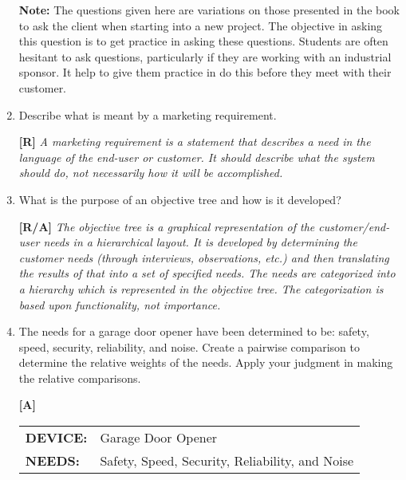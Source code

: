 \begin{enumerate}
\begin{onlysolution}
     \hspace*{1cm}
  \begin{minipage}{.8\textwidth}
  \textbf{Note:} The questions given here are variations on those presented in 
  the book to ask the client when starting into a new project. The objective 
  in asking this question is to get practice in asking these questions. Students 
  are often hesitant to ask questions, particularly if they are working with an 
  industrial sponsor. It help to give them practice in do this before they meet 
  with their customer.
  \end{minipage}
  \end{onlysolution}

\item
  Describe what is meant by a marketing requirement.

  \begin{onlysolution}
  \textbf{[R]}
  \itshape
  A marketing requirement is a statement that describes a need in the language 
  of the end-user or customer. It should describe what the system should do, not 
  necessarily how it will be accomplished.
  \end{onlysolution}

\item
  What is the purpose of an objective tree and how is it developed?
  
  \begin{onlysolution}
  \textbf{[R/A]}
  \itshape
  The objective tree is a graphical representation of the customer/end-user needs 
  in a hierarchical layout. It is developed by determining the customer needs 
  (through interviews, observations, etc.) and then translating the results of 
  that into a set of specified needs. The needs are categorized into a hierarchy 
  which is represented in the objective tree. The categorization is based upon 
  functionality, not importance.
  \end{onlysolution}

\item
  The needs for a garage door opener have been determined to be: safety,
  speed, security, reliability, and noise. Create a pairwise comparison
  to determine the relative weights of the needs. Apply your judgment in
  making the relative comparisons.

  
  \begin{onlysolution}
  \textbf{[A]}
  \itshape
\begin{tabular}{ll}
\textbf{DEVICE:} 	& Garage Door Opener \\ 
\textbf{NEEDS:}	& Safety, Speed, Security, Reliability, and Noise \\ 
\end{tabular}


\end{onlysolution}
\end{enumerate}
